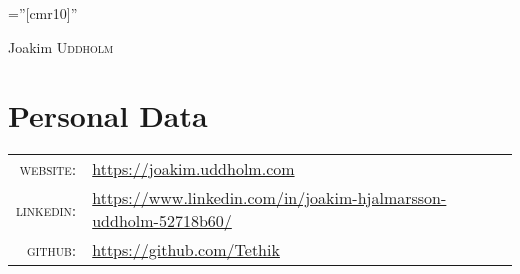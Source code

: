 \documentclass[a4paper,10pt]{article}
\begin{document}
\pagestyle{empty} %

\font\fb=''[cmr10]'' %

\par{\centering
		{\Huge Joakim \textsc{Uddholm}
	}\par}

\section{Personal Data}

\begin{tabular}{rl}    
    \textsc{website:}   & \href{https://joakim.uddholm.com}{https://joakim.uddholm.com}\\    
    \textsc{linkedin:}   & \href{https://www.linkedin.com/in/joakim-hjalmarsson-uddholm-52718b60/}{https://www.linkedin.com/in/joakim-hjalmarsson-uddholm-52718b60/}\\
    \textsc{github:}   & \href{https://github.com/Tethik}{https://github.com/Tethik}\\        
\end{tabular}


\end{document}
